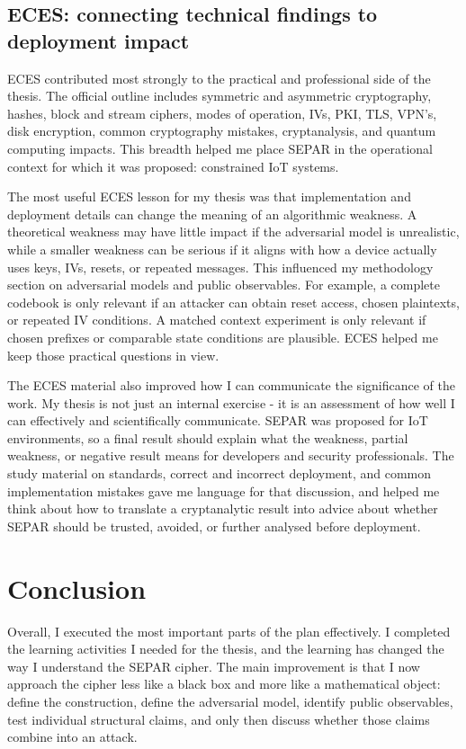 \documentclass[11pt]{article}
\begin{document}
\subsection*{ECES: connecting technical findings to deployment impact}

ECES contributed most strongly to the practical and professional side of the thesis. The official outline includes symmetric and asymmetric cryptography, hashes, block and stream ciphers, modes of operation, IVs, PKI, TLS, VPN's, disk encryption, common cryptography mistakes, cryptanalysis, and quantum computing impacts. This breadth helped me place SEPAR in the operational context for which it was proposed: constrained IoT systems.

The most useful ECES lesson for my thesis was that implementation and deployment details can change the meaning of an algorithmic weakness. A theoretical weakness may have little impact if the adversarial model is unrealistic, while a smaller weakness can be serious if it aligns with how a device actually uses keys, IVs, resets, or repeated messages. This influenced my methodology section on adversarial models and public observables. For example, a complete codebook is only relevant if an attacker can obtain reset access, chosen plaintexts, or repeated IV conditions. A matched context experiment is only relevant if chosen prefixes or comparable state conditions are plausible. ECES helped me keep those practical questions in view.

The ECES material also improved how I can communicate the significance of the work. My thesis is not just an internal exercise - it is an assessment of how well I can effectively and scientifically communicate. SEPAR was proposed for IoT environments, so a final result should explain what the weakness, partial weakness, or negative result means for developers and security professionals. The study material on standards, correct and incorrect deployment, and common implementation mistakes gave me language for that discussion, and helped me think about how to translate a cryptanalytic result into advice about whether SEPAR should be trusted, avoided, or further analysed before deployment.

\section*{Conclusion}

Overall, I executed the most important parts of the plan effectively. I completed the learning activities I needed for the thesis, and the learning has changed the way I understand the SEPAR cipher. The main improvement is that I now approach the cipher less like a black box and more like a mathematical object: define the construction, define the adversarial model, identify public observables, test individual structural claims, and only then discuss whether those claims combine into an attack.
\end{document}
